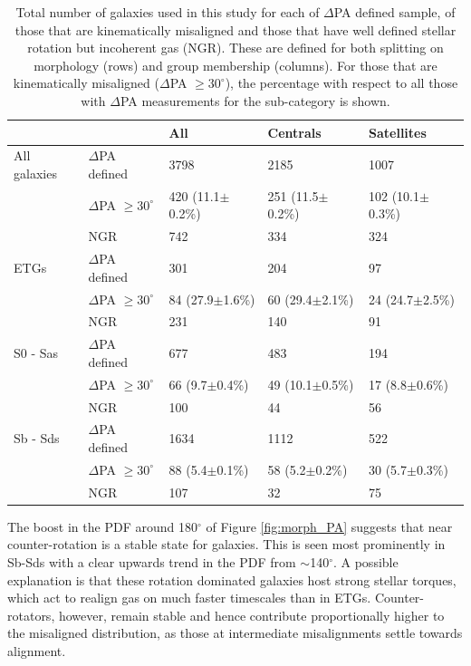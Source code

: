 \documentclass[fleqn,usenatbib]{mnras}
\begin{document}
\begin{table}
\begin{tabular}{lllll}
\hline
        &  & All & Centrals & Satellites \\
\hline
All galaxies & $\Delta$PA defined &  3798 &  2185 &  1007 \\
& $\Delta$PA $\geq 30^{\circ}$ &  420 (11.1$\pm$0.2\%) &  251 (11.5$\pm$0.2\%) &  102 (10.1$\pm$0.3\%) \\
& NGR & 742 &  334 &  324 \\

ETGs & $\Delta$PA defined & 301 & 204 & 97 \\
& $\Delta$PA $\geq 30^{\circ}$ & 84 (27.9$\pm$1.6\%) & 60 (29.4$\pm$2.1\%) & 24 (24.7$\pm$2.5\%)  \\
& NGR & 231 & 140 & 91 \\

S0 - Sas & $\Delta$PA defined & 677 & 483 & 194 \\
& $\Delta$PA $\geq 30^{\circ}$ &  66 (9.7$\pm$0.4\%) & 49 (10.1$\pm$0.5\%) & 17 (8.8$\pm$0.6\%) \\
& NGR & 100 & 44 & 56 \\

Sb - Sds & $\Delta$PA defined & 1634 & 1112 & 522 \\
& $\Delta$PA $\geq 30^{\circ}$ & 88 (5.4$\pm$0.1\%) & 58 (5.2$\pm$0.2\%) & 30 (5.7$\pm$0.3\%) \\
& NGR & 107 & 32 & 75 \\

\end{tabular}
\caption{Total number of galaxies used in this study for each of $\Delta$PA defined sample, of those that are kinematically misaligned and those that have well defined stellar rotation but incoherent gas (NGR). These are defined for both splitting on morphology (rows) and group membership (columns). For those that are kinematically misaligned ($\Delta$PA $\geq 30^{\circ}$), the percentage with respect to all those with $\Delta$PA measurements for the sub-category is shown.}
\label{tab:mega_table}
\end{table}

The boost in the PDF around 180$^{\circ}$ of Figure \ref{fig:morph_PA} suggests that near counter-rotation is a stable state for galaxies. This is seen most prominently in Sb-Sds with a clear upwards trend in the PDF from $\sim$140$^{\circ}$. A possible explanation is that these rotation dominated galaxies host strong stellar torques, which act to realign gas on much faster timescales than in ETGs. Counter-rotators, however, remain stable and hence contribute proportionally higher to the misaligned distribution, as those at intermediate misalignments settle towards alignment. 
\end{document}
